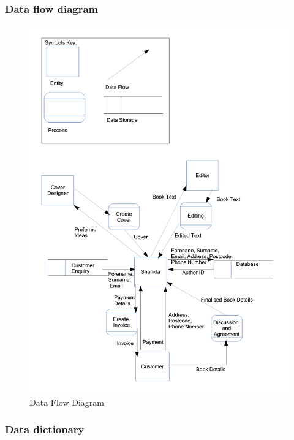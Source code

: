 \subsubsection{Data flow diagram}

\begin{figure}[H]
    \includegraphics[width=\textwidth]{./Analysis/Data_Flow_Diagrams_2.pdf}
    \caption{Data Flow Diagram} \label{Data_Flow_Diagrams_2.pdf}
\end{figure}

\subsubsection{Data dictionary}

